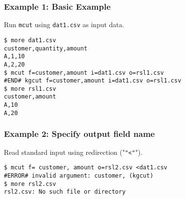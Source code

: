 \subsubsection*{Example 1: Basic Example}

Run \verb|mcut| using \verb|dat1.csv| as input data.


\begin{Verbatim}[baselinestretch=0.7,frame=single]
$ more dat1.csv
customer,quantity,amount
A,1,10
A,2,20
$ mcut f=customer,amount i=dat1.csv o=rsl1.csv
#END# kgcut f=customer,amount i=dat1.csv o=rsl1.csv
$ more rsl1.csv
customer,amount
A,10
A,20
\end{Verbatim}
\subsubsection*{Example 2: Specify output field name}

Read standard input using redirection ("\verb|"<"|").


\begin{Verbatim}[baselinestretch=0.7,frame=single]
$ mcut f= customer, amount o=rsl2.csv <dat1.csv
#ERROR# invalid argument: customer, (kgcut)
$ more rsl2.csv
rsl2.csv: No such file or directory
\end{Verbatim}
